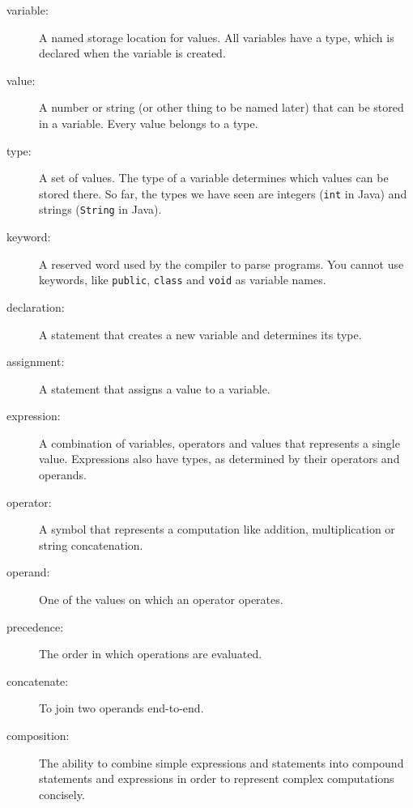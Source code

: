 \documentclass{book}
\begin{document}
\begin{description}

\item[variable:] A named storage location for values.  All
variables have a type, which is declared when the variable
is created.

\item[value:] A number or string (or other thing to be named later)
that can be stored in a variable.  Every value belongs to a type.

\item[type:] A set of values.  The type of a variable
determines which values can be stored there.  So far, the types
we have seen are integers ({\tt int} in Java) and strings
({\tt String} in Java).

\item[keyword:]  A reserved word used by the compiler
to parse programs.  You cannot use keywords, like {\tt public},
{\tt class} and {\tt void} as variable names.

\item[declaration:] A statement that creates a new variable and
determines its type.

\item[assignment:] A statement that assigns a value to a variable.

\item[expression:] A combination of variables, operators and
values that represents a single value.  Expressions also
have types, as determined by their operators and operands.

\item[operator:] A symbol that represents a
computation like addition, multiplication or string
concatenation.

\item[operand:] One of the values on which an operator operates. 

\item[precedence:] The order in which operations are evaluated.

\item[concatenate:] To join two operands end-to-end.

\item[composition:] The ability to combine simple
expressions and statements into compound statements and expressions
in order to represent complex computations concisely.


\end{description}
\end{document}
